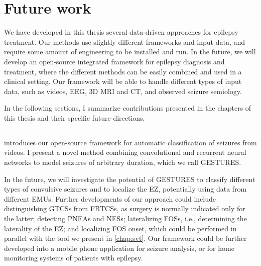 \section{Future work}

We have developed in this thesis several data-driven approaches for epilepsy treatment.
Our methods use slightly different frameworks and input data, and require some amount of engineering to be installed and run.
In the future, we will develop an open-source integrated framework for epilepsy diagnosis and treatment, where the different methods can be easily combined and used in a clinical setting.
Our framework will be able to handle different types of input data, such as videos, \ac{EEG}, 3D \ac{MRI} and \ac{CT}, and observed seizure semiology.


In the following sections, I summarize contributions presented in the chapters of this thesis and their specific future directions.

\subsection{}

 introduces our open-source framework for automatic classification of seizures from videos.
I present a novel method combining convolutional and recurrent neural networks to model seizures of arbitrary duration, which we call \ac{GESTURES}.

In the future, we will investigate the potential of \ac{GESTURES} to classify different types of convulsive seizures and to localize the \ac{EZ}, potentially using data from different \acp{EMU}.
Further developments of our approach could include
distinguishing \acp{GTCS} from \acp{FBTCS}, as surgery is normally indicated only for the latter;
detecting \acp{PNEA} and \acp{NES};
lateralizing \acp{FOS}, i.e., determining the laterality of the \ac{EZ};
and localizing \ac{FOS} onset, which could be performed in parallel with the tool we present in \cref{chap:svt}.
Our framework could be further developed into a mobile phone application for seizure analysis, or for home monitoring systems of patients with epilepsy.


